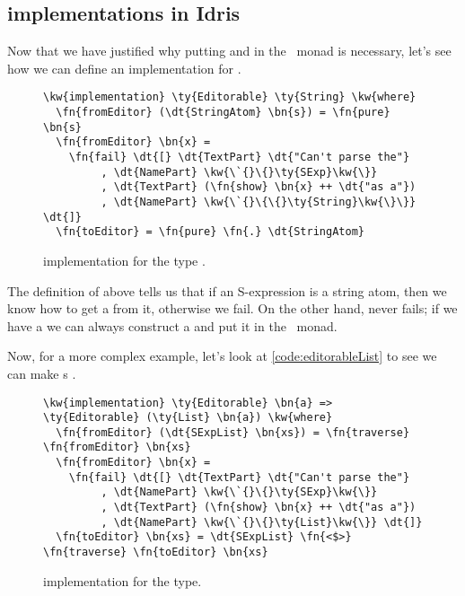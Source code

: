 \subsection{ implementations in Idris}

Now that we have justified why putting  and 
in the \Elab\ monad is necessary,
let's see how we can define an  implementation for .

\begin{figure}[ht]
\caption{ implementation for the type .}
\begin{Verbatim}[framesep=2mm, label=\footnotesize{\normalfont{Idris}}, labelposition=topline]
\kw{implementation} \ty{Editorable} \ty{String} \kw{where}
  \fn{fromEditor} (\dt{StringAtom} \bn{s}) = \fn{pure} \bn{s}
  \fn{fromEditor} \bn{x} =
    \fn{fail} \dt{[} \dt{TextPart} \dt{"Can't parse the"}
         , \dt{NamePart} \kw{\`{}\{}\ty{SExp}\kw{\}}
         , \dt{TextPart} (\fn{show} \bn{x} ++ \dt{"as a"})
         , \dt{NamePart} \kw{\`{}\{\{}\ty{String}\kw{\}\}} \dt{]}
  \fn{toEditor} = \fn{pure} \fn{.} \dt{StringAtom}
\end{Verbatim}
\end{figure}

The definition of  above tells us that if an S-expression is a
string atom, then we know how to get a  from it, otherwise we
fail.  On the other hand,  never fails; if we have a 
we can always construct a  and put it in the \Elab\ monad.

Now, for a more complex example, let's look at \autoref{code:editorableList} to
see we can make s .

\begin{figure}[ht]
  \caption{ implementation for the  type.}
  \label{code:editorableList}
\begin{Verbatim}[framesep=2mm, label=\footnotesize{\normalfont{Idris}}, labelposition=topline]
\kw{implementation} \ty{Editorable} \bn{a} => \ty{Editorable} (\ty{List} \bn{a}) \kw{where}
  \fn{fromEditor} (\dt{SExpList} \bn{xs}) = \fn{traverse} \fn{fromEditor} \bn{xs}
  \fn{fromEditor} \bn{x} =
    \fn{fail} \dt{[} \dt{TextPart} \dt{"Can't parse the"}
         , \dt{NamePart} \kw{\`{}\{}\ty{SExp}\kw{\}}
         , \dt{TextPart} (\fn{show} \bn{x} ++ \dt{"as a"})
         , \dt{NamePart} \kw{\`{}\{}\ty{List}\kw{\}} \dt{]}
  \fn{toEditor} \bn{xs} = \dt{SExpList} \fn{<$>} \fn{traverse} \fn{toEditor} \bn{xs}
\end{Verbatim}
\end{figure}

